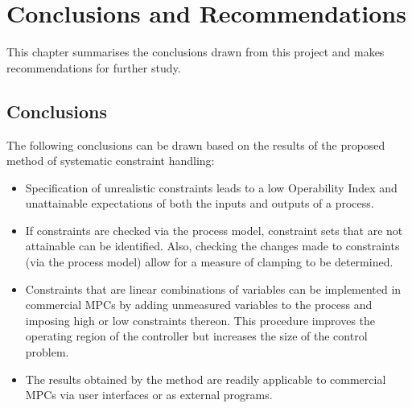 \chapter{Conclusions and Recommendations}\label{chap:conclusion}
\begin{overview}
  This chapter summarises the conclusions drawn from this project and makes recommendations for further study.
\end{overview}

\section{Conclusions}
The following conclusions can be drawn based on the results of the proposed method of systematic constraint handling:
\begin{itemize}
  \item Specification of unrealistic constraints leads to a low Operability Index and unattainable expectations of both the inputs and outputs of a process.
  \item If constraints are checked via the process model, constraint sets that are not attainable can be identified. Also, checking the changes made to constraints (via the process model) allow for a measure of clamping to be determined.
  \item Constraints that are linear combinations of variables can be implemented in commercial MPCs by adding unmeasured variables to the process and imposing high or low constraints thereon.
This procedure improves the operating region of the controller but increases the size of the control problem.
  \item The results obtained by the method are readily applicable to commercial MPCs via user interfaces or as external programs.
\end{itemize}

